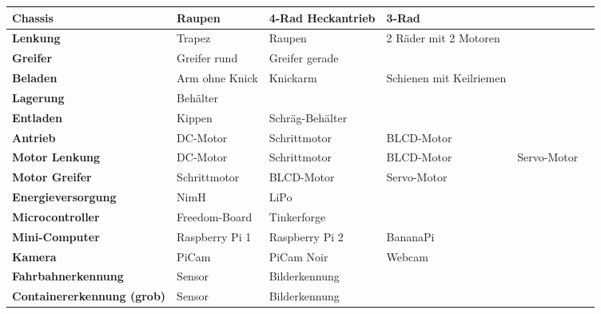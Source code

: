 \documentclass[a4paper, 10pt, fleqn]{article}
\begin{document}


\begin{table}[h]
\begin{tabular}{|m{}|M{0.15\textwidth}|M{0.15\textwidth}|M{0.15\textwidth}|M{0.15\textwidth}M{0.001\textwidth}|}
\hline

\textbf{Chassis} & Raupen & 4-Rad Heckantrieb & 3-Rad && \\[5ex]\hline 

\textbf{Lenkung} & Trapez & Raupen & 2 Räder mit 2 Motoren &&\\[5ex]\hline

\textbf{Greifer} & Greifer rund & Greifer gerade &&&\\[5ex]\hline

\textbf{Beladen} & Arm ohne Knick & Knickarm & Schienen mit Keilriemen&&\\[5ex]\hline

\textbf{Lagerung} & Behälter &&&&\\[5ex]\hline

\textbf{Entladen} & Kippen & Schräg-Behälter &&&\\[5ex]\hline

\textbf{Antrieb} & DC-Motor & Schrittmotor & BLCD-Motor &&\\[5ex]\hline

\textbf{Motor Lenkung} & DC-Motor & Schrittmotor & BLCD-Motor & Servo-Motor&\\[5ex]\hline

\textbf{Motor Greifer} & Schrittmotor & BLCD-Motor & Servo-Motor&&\\[5ex]\hline

\textbf{Energieversorgung} & NimH & LiPo&&&\\[5ex]\hline

\textbf{Microcontroller} & Freedom-Board & Tinkerforge & &&\\[5ex]\hline

\textbf{Mini-Computer} & Raspberry Pi 1 & Raspberry Pi 2 & BananaPi&&\\[5ex]\hline

\textbf{Kamera} & PiCam & PiCam Noir & Webcam & &\\[5ex]\hline

\textbf{Fahrbahnerkennung} & Sensor & Bilderkennung &&&\\[5ex]\hline

\textbf{Containererkennung (grob)} & Sensor & Bilderkennung&&& \\[5ex]\hline


\end{tabular}
\end{table}
\end{document}
